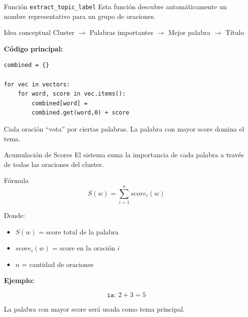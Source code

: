 \begin{frame}[fragile]{Función \texttt{extract\_topic\_label}}
Esta función descubre automáticamente un nombre representativo
para un grupo de oraciones.

\vspace{0.4em}

\begin{block}{Idea conceptual}
Cluster
$\rightarrow$
Palabras importantes
$\rightarrow$
Mejor palabra
$\rightarrow$
Título
\end{block}

\vspace{0.3em}

\textbf{Código principal:}

\begin{verbatim}
combined = {}

for vec in vectors:
    for word, score in vec.items():
        combined[word] =
        combined.get(word,0) + score
\end{verbatim}

\vspace{0.3em}

Cada oración ``vota'' por ciertas palabras.
La palabra con mayor score domina el tema.

\end{frame}


\begin{frame}{Acumulación de Scores}
El sistema suma la importancia de cada palabra
a través de todas las oraciones del cluster.

\vspace{0.4em}

\begin{block}{Fórmula}
\[
S(w)=\sum_{i=1}^{n} score_i(w)
\]
\end{block}

Donde:

\begin{itemize}
    \item $S(w)$ = score total de la palabra
    \item $score_i(w)$ = score en la oración $i$
    \item $n$ = cantidad de oraciones
\end{itemize}

\vspace{0.3em}

\textbf{Ejemplo:}

\[
\texttt{ia: }2 + 3 = 5
\]

\vspace{0.2em}

La palabra con mayor score será usada como tema principal.

\end{frame}

